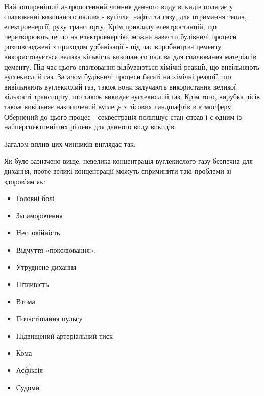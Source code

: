 Найпоширеніший антропогенний чинник данного виду викидів полягає у спалюванні викопаного палива - вугілля, нафти та газу, для отримання тепла, електроенергії, руху транспорту.
Крім прикладу електростанцій, що перетворюють тепло на електроенергію, можна навести будівничі процеси розповсюджені з приходом урбанізації - під час виробництва цементу використовується велика кількість викопаного палива для спалювання матеріалів цементу. 
Під час цього спалювання відбуваються хімічні реакції, що вивільняють вуглекислий газ.
Загалом будівничі процеси багаті на хімічні реакції, що вивільняють вуглекислий газ, також вони залучають використання великої кількості транспорту, що також викидає вуглекислий газ.
Крім того, вирубка лісів також вивільняє накопичений вуглець з лісових ландшафтів в атмосферу. 
Обернений до цього процес - секвестрація поліпшує стан справ і є одним із найперспективніших рішень для данного виду викидів. 

Загалом вплив цих чинників виглядає так:



\begin{center}
\end{center}

\vspace{0.75cm}

Як було зазначено вище, невелика концентрація вуглекислого газу безпечна для дихання, проте великі концентрації можуть спричинити такі проблеми зі здоров'ям як: 


\begin{multicols}{2}
    \begin{itemize}
        \item Головні болі
        \item Запаморочення
        \item Неспокійність
        \item Відчуття «поколювання».
        \item Утруднене дихання
        \item Пітливість
        \item Втома
        \item Почастішання пульсу
        \item Підвищений артеріальний тиск
        \item Кома
        \item Асфіксія
        \item Судоми
    \end{itemize}
\end{multicols}
    
